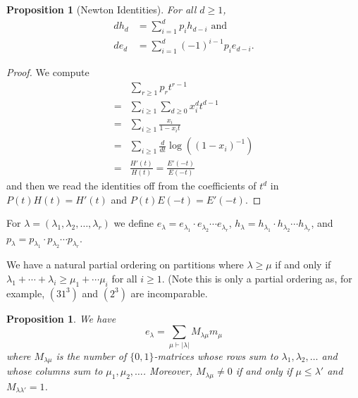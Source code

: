 \documentclass[12pt]{article}
\theoremstyle{plain}
\newtheorem{proposition}[theorem]{Proposition}
\theoremstyle{definition}
\theoremstyle{remark}
\numberwithin{equation}{section}
\begin{document}
\begin{proposition}[Newton Identities] For all $d \ge 1$,
\begin{align*}
dh_d&=\sum_{i=1}^d p_i h_{d-i} \textrm{ and} \\ 
de_d&=\sum_{i=1}^d (-1)^{i-1} p_i e_{d-i}.
\end{align*}
\end{proposition}

\begin{proof}
We compute
\begin{align*}
&\sum_{r \ge 1} p_r t^{r-1}\\
 =& \sum_{i \ge 1} \sum_{d \ge 0} x_i^d t^{d-1} \\
=& \sum_{i \ge 1} \frac{x_i}{1-x_it}\\
=& \sum_{i \ge 1} \frac{d}{dt}\log\left(
\left(1-x_i\right)^{-1}\right)\\
=& \frac{H'(t)}{H(t)} = \frac{E'(-t)}{E(-t)}
\end{align*}
and then we read the identities off from 
the coefficients of $t^d$ in $P(t)H(t)=H'(t)$
and $P(t)E(-t)=E'(-t)$.
\end{proof}

For $\lambda=(\lambda_1,\lambda_2,\ldots,\lambda_r)$ we define
$e_\lambda = e_{\lambda_1}\cdot e_{\lambda_2} \cdots e_{\lambda_r}$,
$h_\lambda = h_{\lambda_1}\cdot h_{\lambda_2} \cdots h_{\lambda_r}$, and
$p_\lambda = p_{\lambda_1}\cdot p_{\lambda_2} \cdots p_{\lambda_r}$.

We have a natural partial ordering on partitions where $\lambda \ge \mu$
if and only if
$\lambda_1 + \cdots + \lambda_i \ge \mu_1 + \cdots \mu_i$
for all $i \ge 1$.
(Note this is only a partial ordering as, for example, $(31^3)$ and $(2^3)$
are incomparable.

\begin{proposition} \label{prop:01matrix}
We have
\[
e_\lambda = \sum_{\mu \vdash |\lambda|} M_{\lambda \mu} m_\mu
\]
where $M_{\lambda \mu}$ is the number of $\{0,1\}$-matrices whose
rows sum to $\lambda_1,\lambda_2,\ldots$ and whose columns
sum to $\mu_1,\mu_2,\ldots$.
Moreover, $M_{\lambda\mu} \ne 0$ if and only if $\mu \le \lambda'$
and $M_{\lambda\lambda'}=1$.
\end{proposition}
\end{document}
